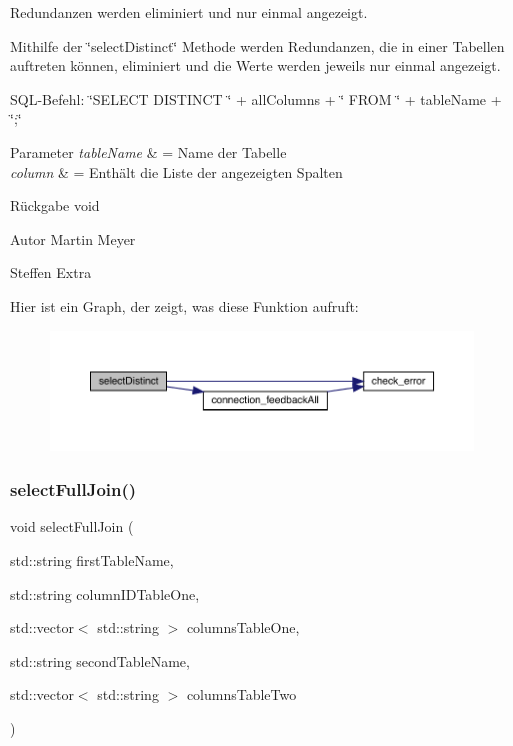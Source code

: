 Redundanzen werden eliminiert und nur einmal angezeigt. 

Mithilfe der \char`\"{}select\+Distinct\char`\"{} Methode werden Redundanzen, die in einer Tabellen auftreten können, eliminiert und die Werte werden jeweils nur einmal angezeigt.~\newline


S\+Q\+L-\/\+Befehl\+: \char`\"{}\+S\+E\+L\+E\+C\+T D\+I\+S\+T\+I\+N\+C\+T \char`\"{} + all\+Columns + \char`\"{} F\+R\+O\+M \char`\"{} + table\+Name + \char`\"{};\char`\"{}


\begin{DoxyParams}{Parameter}
{\em table\+Name} & = Name der Tabelle \\
\hline
{\em column} & = Enthält die Liste der angezeigten Spalten\\
\hline
\end{DoxyParams}
\begin{DoxyReturn}{Rückgabe}
void
\end{DoxyReturn}
\begin{DoxyAuthor}{Autor}
Martin Meyer 

Steffen Extra 
\end{DoxyAuthor}
Hier ist ein Graph, der zeigt, was diese Funktion aufruft\+:\nopagebreak
\begin{figure}[H]
\begin{center}
\leavevmode
\includegraphics[width=350pt]{selection_request_8cpp_aba13caf613af9f91f2a2f1a8f9d49967_cgraph}
\end{center}
\end{figure}
\mbox{\label{selection_request_8cpp_a41392b97718c999af4867dc0c62ade0c}} 
\subsubsection{select\+Full\+Join()}
{\footnotesize\ttfamily void select\+Full\+Join (\begin{DoxyParamCaption}\item[{std\+::string}]{first\+Table\+Name,  }\item[{std\+::string}]{column\+I\+D\+Table\+One,  }\item[{std\+::vector$<$ std\+::string $>$}]{columns\+Table\+One,  }\item[{std\+::string}]{second\+Table\+Name,  }\item[{std\+::vector$<$ std\+::string $>$}]{columns\+Table\+Two }\end{DoxyParamCaption})}



